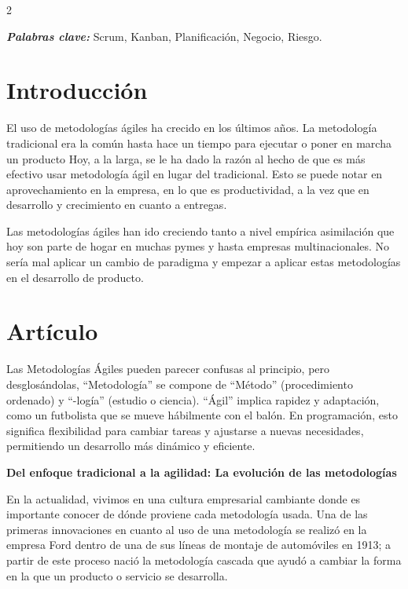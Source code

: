 \documentclass[12pt,spanish,Letterpaper,openany]{book}
\begin{document}
\begin {multicols}{2}

\textbf{\emph{Palabras clave:}} Scrum, Kanban, Planificación, Negocio, Riesgo.

\hypertarget{introducciuxf3n}{%
\section{Introducción}\label{introducciuxf3n}}

El uso de metodologías ágiles ha crecido en los últimos años. La metodología tradicional era la común hasta hace un tiempo para ejecutar o poner en marcha un producto Hoy, a la larga, se le ha dado la razón al hecho de que es más efectivo usar metodología ágil en lugar del tradicional. Esto se puede notar en aprovechamiento en la empresa, en lo que es productividad, a la vez que en desarrollo y crecimiento en cuanto a entregas.

Las metodologías ágiles han ido creciendo tanto a nivel empírica asimilación que hoy son parte de hogar en muchas pymes y hasta empresas multinacionales. No sería mal aplicar un cambio de paradigma y empezar a aplicar estas metodologías en el desarrollo de producto.

\hypertarget{artuxedculo}{%
\section{Artículo}\label{artuxedculo}}

Las Metodologías Ágiles pueden parecer confusas al principio, pero desglosándolas, ``Metodología'' se compone de ``Método'' (procedimiento ordenado) y ``-logía'' (estudio o ciencia). ``Ágil'' implica rapidez y adaptación, como un futbolista que se mueve hábilmente con el balón. En programación, esto significa flexibilidad para cambiar tareas y ajustarse a nuevas necesidades, permitiendo un desarrollo más dinámico y eficiente.

\bigskip

\textbf{Del enfoque tradicional a la agilidad: La evolución de las metodologías}

En la actualidad, vivimos en una cultura empresarial cambiante donde es importante conocer de dónde proviene cada metodología usada. Una de las primeras innovaciones en cuanto al uso de una metodología se realizó en la empresa Ford dentro de una de sus líneas de montaje de automóviles en 1913; a partir de este proceso nació la metodología cascada que ayudó a cambiar la forma en la que un producto o servicio se desarrolla.


\end{multicols}
\end{document}
